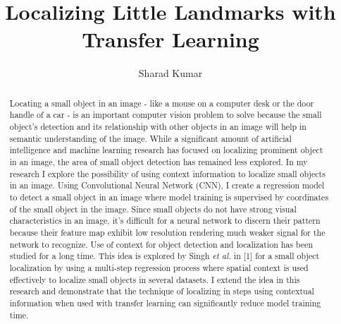 \documentclass [11pt,letterpaper ,twoside ,openany ]{report}
\title{Localizing Little Landmarks with Transfer Learning}
\author{Sharad Kumar}
\begin{document}
  \maketitle
  \tableofcontents

    \begin{abstract}
    Locating a small object in an image - like a mouse on a computer desk or the door handle of a car - is an important computer vision problem to solve because the small object's detection and its relationship with other objects in an image will help in semantic understanding of the image. While a significant amount of artificial intelligence and machine learning research has focused on localizing prominent object in an image, the area of small object detection has remained less explored. In my research I explore the possibility of using context information to localize small objects in an image. Using Convolutional Neural Network (CNN), I create a regression model to detect a small object in an image where model training is supervised by coordinates of the small object in the image. Since small objects do not have strong visual characteristics in an image, it's difficult for a neural network to discern their pattern because their feature map exhibit low resolution rendering much weaker signal for the network to recognize. Use of context for object detection and localization has been studied for a long time. This idea is explored by Singh \textit{et al.} in [1] for a small object localization by using a multi-step regression process where  spatial context is used effectively to localize small objects in several datasets. I extend the idea in this research and demonstrate that the technique of localizing in steps using contextual information when used with transfer learning can significantly reduce model training time.
    \end{abstract}    

    \listoffigures
\end{document}
